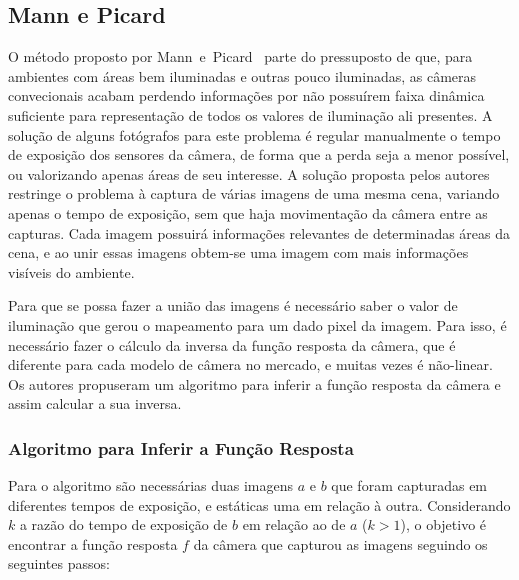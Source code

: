 \subsection{Mann e Picard} \label{metodoMann}
O método proposto por Mann~e~Picard~\cite{mann} parte do pressuposto de que, para ambientes com áreas bem iluminadas e outras pouco iluminadas, as câmeras convecionais acabam perdendo informações por não possuírem faixa dinâmica suficiente para representação de todos os valores de iluminação ali presentes. A solução de alguns fotógrafos para este problema é regular manualmente o tempo de exposição dos sensores da câmera, de forma que a perda seja a menor possível, ou valorizando apenas áreas de seu interesse. A solução proposta pelos autores restringe o problema à captura de várias imagens de uma mesma cena, variando apenas o tempo de exposição, sem que haja movimentação da câmera entre as capturas. Cada imagem possuirá informações relevantes de determinadas áreas da cena, e ao unir essas imagens obtem-se uma imagem com mais informações visíveis do ambiente.
 
 
Para que se possa fazer a união das imagens é necessário saber o valor de iluminação que gerou o mapeamento para um dado pixel da imagem. Para isso, é necessário fazer o cálculo da inversa da função resposta da câmera, que é diferente para cada modelo de câmera no mercado, e muitas vezes é não-linear. Os autores propuseram um algoritmo para inferir a função resposta da câmera e assim calcular a sua inversa.

\subsubsection{Algoritmo para Inferir a Função Resposta} \label{metodoMannAlg}

Para o algoritmo são necessárias duas imagens $a$ e $b$ que foram capturadas em diferentes tempos de exposição, e estáticas uma em relação à outra. Considerando $k$ a razão do tempo de exposição de $b$ em relação ao de $a$ ($k > 1$), o objetivo é encontrar a função resposta $f$ da câmera que capturou as imagens seguindo os seguintes passos:

